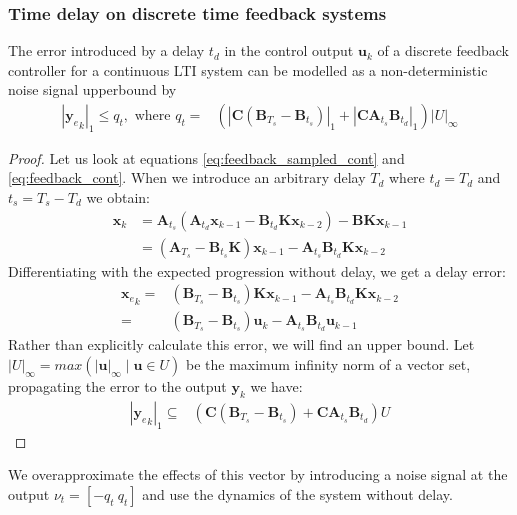 \documentclass[sigconf]{llncs}
\newcommand{\mat}[1]{\boldsymbol{#1}}
\renewcommand{\vec}[1]{\boldsymbol{#1}}
\begin{document}
\subsubsection{Time delay on discrete time feedback systems} \label{sec:delay}
\begin{theorem}
The error introduced by a delay $t_d$ in the control output $\vec{u}_k$ of a discrete feedback controller for a continuous LTI system can be modelled as a non-deterministic noise signal upperbound by 
\begin{align}
|{\vec{y}_e}_{k}|_1 \leq q_t, \text{ where } q_t=&(|\mat{C}(\mat{B}_{T_s}-\mat{B}_{t_s})|_1+|\mat{C}\mat{A}_{t_s}\mat{B}_{t_d}|_1)|U|_\infty
\end{align}
\end{theorem}

\begin{proof}
Let us look at equations \eqref{eq:feedback_sampled_cont} and
\eqref{eq:feedback_cont}.  When we introduce an arbitrary delay $T_d$ where
$t_d=T_d$ and $t_s=T_s-T_d$ we obtain:
%
\begin{align}
\vec{x}_{k} &=\mat{A}_{t_s}(\mat{A}_{t_d}\vec{x}_{k-1}-\mat{B}_{t_d}\mat{K}\vec{x}_{k-2})-\mat{B}\mat{K}\vec{x}_{k-1}\nonumber\\
&=  (\mat{A}_{T_s}-\mat{B}_{t_s}\mat{K})\vec{x}_{k-1}-\mat{A}_{t_s}\mat{B}_{t_d}\mat{K}\vec{x}_{k-2}
\label{eq:delay_cont}
\end{align}
%
Differentiating with the expected progression without delay, we get a delay
error:
%
\begin{align}
{\vec{x}_e}_{k}=&(\mat{B}_{T_s}-\mat{B}_{t_s})\mat{K}\vec{x}_{k-1}-\mat{A}_{t_s}\mat{B}_{t_d}\mat{K}\vec{x}_{k-2}\nonumber\\
=&(\mat{B}_{T_s}-\mat{B}_{t_s})\vec{u}_{k}-\mat{A}_{t_s}\mat{B}_{t_d}\vec{u}_{k-1}
\end{align}
Rather than explicitly calculate this error, we will find an upper bound. Let $|U|_\infty=max(|\vec{u}|_\infty \mid \vec{u} \in U)$ be the maximum infinity norm of a vector set, propagating the error to the output $\vec{y}_k$ we have:
\begin{align}
|{\vec{y}_e}_{k}|_1 \subseteq &(\mat{C}(\mat{B}_{T_s}-\mat{B}_{t_s})+\mat{C}\mat{A}_{t_s}\mat{B}_{t_d})U
\end{align}
\end{proof}
We overapproximate the effects of this vector by introducing a noise signal at the output $\nu_t=[-q_t\ q_t]$ and use the dynamics of the system without delay.
\end{document}
